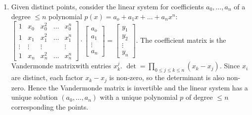 \documentclass[11pt]{article}
\theoremstyle{definition}
\numberwithin{equation}{subsection}
\begin{document}
\begin{enumerate}
\begin{enumerate}
Show that if $x_0$, $x_1$, $\dots$, $x_n$ are all distinct, then there is a \emph{unique} polynomial, $p$, of degree $n$ such that 
$$p(x_0)=y_0,\quad p(x_1)=y_1,\quad \dots,\quad p(x_n)=y_n.$$
\emph{Hint: You do not need to find explicit expressions for $p$.}
(This is a generalization of the fact that two distinct points determine a line $y=mx+b$.)
\item[] Given distinct points, consider the linear system for coefficients $a_0,\ldots,a_n$ of a degree $\leq n$ polynomial $p(x)=a_o+a_1x+\ldots+a_nx^n$: $\begin{bmatrix}
    1&x_0&x_0^2&\ldots&x_0^n\\1&x_1&x_1^2&\ldots&x_1^n\\ \vdots&\vdots&\vdots&&\vdots\\ 1&x_n&x_n^2&\ldots&x_n^n
\end{bmatrix}\cdot\begin{bmatrix}
    a_o\\a_1\\ \vdots\\a_n
\end{bmatrix}=\begin{bmatrix}
    y_1\\y_2\\ \vdots\\y_n
\end{bmatrix}$. The coefficient matrix is the Vandermonde matrixwith entries $x_k^j$. $\det=\prod_{0\leq j\leq k\leq n}(x_k-x_j)$. Since $x_i$ are distinct, each factor $x_k-x_j$ is non-zero, so the determinant is also non-zero. Hence the Vandermonde matrix is invertible and the linear system has a unique solution $(a_0,\ldots,a_n)$ with a unique polynomial $p$ of degree $\leq n$ corresponding the points.


\end{enumerate}

\end{enumerate}
\end{document}
